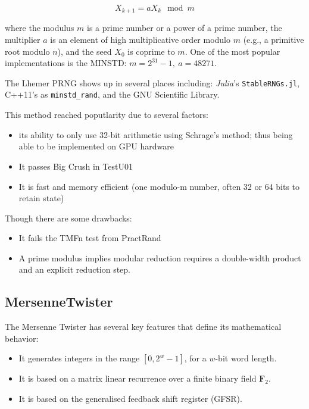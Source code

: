 \documentclass{article}
\begin{document}
            \begin{equation*}
                X_{k + 1} = a X_k \mod m
            \end{equation*}

            where the modulus $m$ is a prime number or a power of a prime number, the multiplier $a$ is an element of high multiplicative order modulo $m$ (e.g., a primitive root modulo $n$), and the seed $X_0$ is coprime to $m$.  One of the most popular implementations is the MINSTD: $m = 2^{31} - 1,\ a = 48271$.

            The Lhemer PRNG shows up in several places including: \emph{Julia}'s \texttt{StableRNGs.jl}\cite{StableRNGs}, C++11's as \texttt{minstd\_rand}\cite{CppLhemer}, and the GNU Scientific Library\cite{GNUSciLib}.

            This method reached poputlarity due to several factors:
            
            \begin{itemize}
                \item its ability to only use 32-bit arithmetic using Schrage's method; thus being able to be implemented on GPU hardware
                \item It passes Big Crush in TestU01\cite{TestU01}
                \item It is fast and memory efficient (one modulo-m number, often 32 or 64 bits to retain state)
            \end{itemize}
\pagebreak
            Though there are some drawbacks:

            \begin{itemize}
                \item It fails the TMFn test from PractRand\cite{Practrand}
                \item A prime modulus implies modular reduction requires a double-width product and an explicit reduction step.
            \end{itemize}
        
        \subsection*{MersenneTwister}

            The Mersenne Twister has several key features that define its mathematical behavior:

            \begin{itemize}
                \item It generates integers in the range $[0, 2^w - 1]$, for a $w$-bit word length.
                \item It is based on a matrix linear recurrence over a finite binary field $\mathbf{F}_2$.
                \item It is based on the generalised feedback shift register (GFSR)\cite{TwistedGFSR}.
            \end{itemize}
\end{document}
